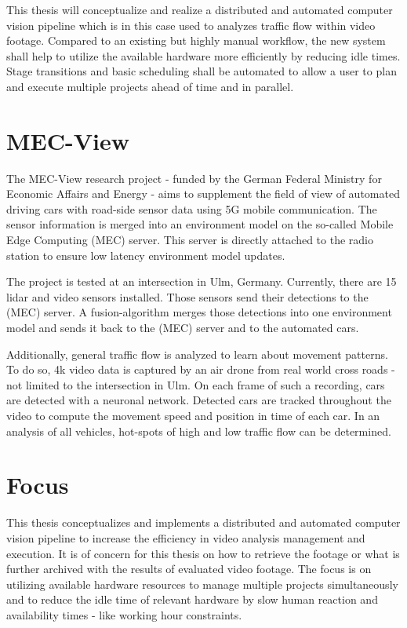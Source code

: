 This thesis will conceptualize and realize a distributed and automated computer vision pipeline which is in this case used to analyzes traffic flow within video footage.
Compared to an existing but highly manual workflow, the new system shall help to utilize the available hardware more efficiently by reducing idle times.
Stage transitions and basic scheduling shall be automated to allow a user to plan and execute multiple projects ahead of time and in parallel.



\newpage
\section{MEC-View}


The MEC-View research project\cite{mecview:main} - funded by the German Federal Ministry for Economic Affairs and Energy - aims to supplement the field of view of automated driving cars with road-side sensor data using 5G mobile communication. The sensor information is merged into an environment model on the so-called Mobile Edge Computing (MEC) server. This server is directly attached to the radio station to ensure low latency environment model updates.

The project is tested at an intersection in Ulm, Germany.
Currently, there are 15 lidar and video sensors installed.
Those sensors send their detections to the (MEC) server.
A fusion-algorithm merges those detections into one environment model and sends it back to the (MEC) server and to the automated cars.

Additionally, general traffic flow is analyzed to learn about movement patterns.
To do so, 4k video data is captured by an air drone from real world cross roads - not limited to the intersection in Ulm.
On each frame of such a recording, cars are detected with a neuronal network.
Detected cars are tracked throughout the video to compute the movement speed and position in time of each car.
In an analysis of all vehicles, hot-spots of high and low traffic flow can be determined.

\section{Focus}

This thesis conceptualizes and implements a distributed and automated computer vision pipeline to increase the efficiency in video analysis management and execution.
It is of concern for this thesis on how to retrieve the footage or what is further archived with the results of evaluated video footage.
The focus is on utilizing available hardware resources to manage multiple projects simultaneously and to reduce the idle time of relevant hardware by slow human reaction and availability times - like working hour constraints.

